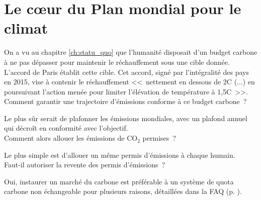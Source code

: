 \documentclass[a5paper,french]{memoir}
\begin{document}



\chapter{Le cœur du Plan mondial pour le climat\label{ch:coeur}}


On a vu au chapitre \ref{ch:statu_quo} que l'humanité disposait d'un budget carbone à ne pas dépasser pour maintenir le réchauffement sous une cible donnée. L'accord de Paris établit cette cible. Cet accord, signé par l'intégralité des pays en 2015,  vise à contenir le réchauffement <<~nettement en dessous de 2\textdegree{}C (...) en poursuivant l'action menée pour limiter l'élévation de température à 1,5\textdegree{}C~>>. \\

Comment garantir une trajectoire d'émissions conforme à ce budget carbone~? 

Le plus sûr serait de plafonner les émissions mondiales, avec un plafond annuel qui décroît en conformité avec l'objectif. \\

Comment alors allouer les émissions de CO$_\text{2}$ permises~? 

Le plus simple %
est d'allouer un même permis d'émissions à chaque humain. \\

Faut-il autoriser la revente des permis d'émissions~? 

Oui, %
instaurer un marché du carbone est préférable à un système de quota carbone non échangeable pour plusieurs raisons, détaillées dans la FAQ (p. \pageref{q:rationnement}). %
\end{document}
